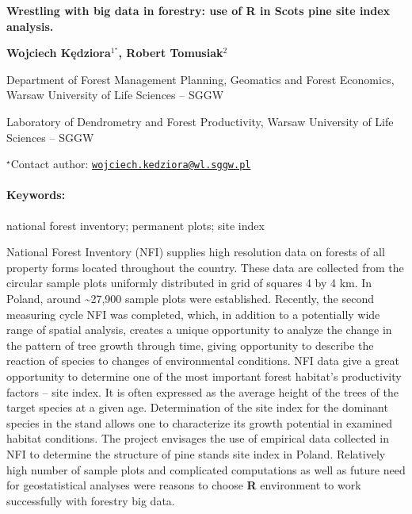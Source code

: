 \documentclass[11pt, a4paper]{article}
\renewcommand{\title}[1]{\begin{center}{\bf \LARGE #1}\end{center}}
\newcommand{\keywords}{\paragraph{Keywords:}}
\begin{document}
\pagestyle{empty}

\title{Wrestling with big data in forestry: use of R in Scots pine site index
analysis.}

\begin{center}
  {\bf Wojciech Kędziora$^{1^\star}$, Robert Tomusiak$^{2}$}
\end{center}

\vskip 0.3cm

\begin{affiliations}
\begin{enumerate}
\begin{minipage}{0.915\textwidth}
\centering
\item Department of Forest Management Planning, Geomatics and Forest
Economics, Warsaw University of Life Sciences -- SGGW \\[-2pt]
\item Laboratory of Dendrometry and Forest Productivity, Warsaw University of
Life Sciences -- SGGW \\[-2pt]
\end{minipage}
\end{enumerate}
$^\star$Contact author: \href{mailto:wojciech.kedziora@wl.sggw.pl}{\nolinkurl{wojciech.kedziora@wl.sggw.pl}}\\
\end{affiliations}

\vskip 0.5cm

\begin{minipage}{0.915\textwidth}
\keywords national forest inventory; permanent plots; site index
\end{minipage}

\vskip 0.8cm

National Forest Inventory (NFI) supplies high resolution data on forests
of all property forms located throughout the country. These data are
collected from the circular sample plots uniformly distributed in grid
of squares 4 by 4 km. In Poland, around \textasciitilde{}27,900 sample
plots were established. Recently, the second measuring cycle NFI was
completed, which, in addition to a potentially wide range of spatial
analysis, creates a unique opportunity to analyze the change in the
pattern of tree growth through time, giving opportunity to describe the
reaction of species to changes of environmental conditions. NFI data
give a great opportunity to determine one of the most important forest
habitat's productivity factors -- site index. It is often expressed as
the average height of the trees of the target species at a given age.
Determination of the site index for the dominant species in the stand
allows one to characterize its growth potential in examined habitat
conditions. The project envisages the use of empirical data collected in
NFI to determine the structure of pine stands site index in Poland.
Relatively high number of sample plots and complicated computations as
well as future need for geostatistical analyses were reasons to choose
\textbf{R} environment to work successfully with forestry big data.
\end{document}
